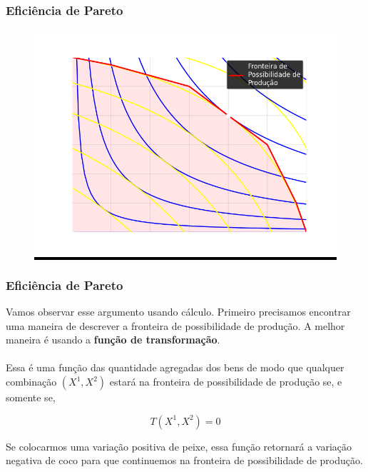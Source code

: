 \documentclass{beamer}[10]
\begin{document}
\begin{frame}
	\frametitle{Eficiência de Pareto}

	\begin{figure}[H]
		\centering
		\colorbox{black}{\includegraphics[scale=0.6]{cap33_11-edgeworth_prod.png}}
	\end{figure}

\end{frame}

\begin{frame}
	\frametitle{Eficiência de Pareto}

	Vamos observar esse argumento usando cálculo. Primeiro precisamos encontrar uma maneira de descrever a fronteira de possibilidade de produção. A melhor maneira é usando a \textbf{função de transformação}.
	\\~\\
	Essa é uma função das quantidade agregadas dos bens de modo que qualquer combinação $(X^1,X^2)$ estará na fronteira de possibilidade de produção se, e somente se,

	$$ T(X^1,X^2) = 0 $$

	Se colocarmos uma variação positiva de peixe, essa função retornará a variação negativa de coco para que continuemos na fronteira de possibilidade de produção.

\end{frame}
\end{document}
